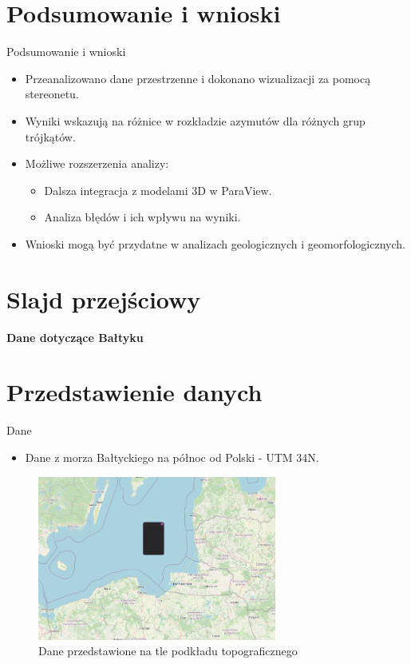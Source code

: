 \documentclass{beamer}
\begin{document}
\section{Podsumowanie i wnioski}
\begin{frame}{Podsumowanie i wnioski}
    \begin{itemize}
        \item Przeanalizowano dane przestrzenne i dokonano wizualizacji za pomocą stereonetu.
        \item Wyniki wskazują na różnice w rozkładzie azymutów dla różnych grup trójkątów.
        \item Możliwe rozszerzenia analizy:
        \begin{itemize}
            \item Dalsza integracja z modelami 3D w ParaView.
            \item Analiza błędów i ich wpływu na wyniki.
        \end{itemize}
        \item Wnioski mogą być przydatne w analizach geologicznych i geomorfologicznych.
    \end{itemize}
\end{frame}

\section{Slajd przejściowy}
\begin{frame}
	\centering
	{\Huge \textbf{Dane dotyczące Bałtyku}}
\end{frame}


\section{Przedstawienie danych}
\begin{frame}{Dane}
	\begin{itemize}
		\item Dane z morza Bałtyckiego na północ od Polski - UTM 34N.
	\end{itemize}
	\begin{figure}
		\includegraphics[width=0.7\textwidth]{screen1.png}
		\caption{Dane przedstawione na tle podkładu topograficznego}
	\end{figure}
\end{frame}
\end{document}
